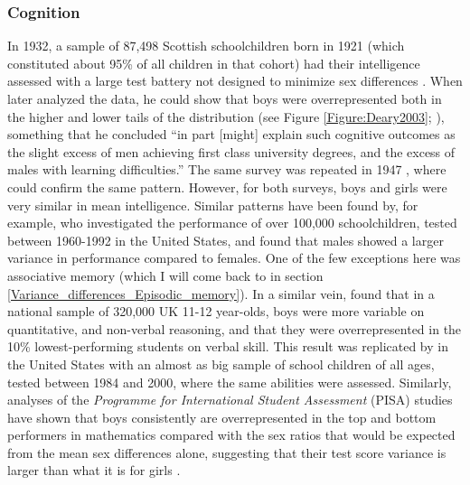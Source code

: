 \subsubsection{Cognition} In 1932, a sample of 87,498 Scottish schoolchildren born in 1921 (which constituted about 95\% of all children in that cohort) had their intelligence assessed with a large test battery not designed to minimize sex differences \parencite{SCRE1933}. When \textcite{Deary2003} later analyzed the data, he could show that boys were overrepresented both in the higher and lower tails of the distribution (see Figure \ref{Figure:Deary2003}; \cite{Deary2003}), something that he concluded ``in part [might] explain such cognitive outcomes as the slight excess of men achieving first class university degrees, and the excess of males with learning difficulties.'' The same survey was repeated in 1947 \parencite{SCRE1949}, where \textcite{Johnson2008} could confirm the same pattern. However, for both surveys, boys and girls were very similar in mean intelligence. Similar patterns have been found by, for example, \textcite{Hedges1995} who investigated the performance of over 100,000 schoolchildren, tested between 1960-1992 in the United States, and found that males showed a larger variance in performance compared to females. One of the few exceptions here was associative memory (which I will come back to in section \ref{Variance_differences_Episodic_memory}). In a similar vein, \textcite{Strand2006} found that in a national sample of 320,000 UK 11-12 year-olds, boys were more variable on quantitative, and non-verbal reasoning, and that they were overrepresented in the 10\% lowest-performing students on verbal skill. This result was replicated by \textcite{Lohman2009} in the United States with an almost as big sample of school children of all ages, tested between 1984 and 2000, where the same abilities were assessed. Similarly, analyses of the \emph{Programme for International Student Assessment} (PISA) studies have shown that boys consistently are overrepresented in the top and bottom performers in mathematics compared with the sex ratios that would be expected from the mean sex differences alone, suggesting that their test score variance is larger than what it is for girls \parencite{Stoet2015}.

